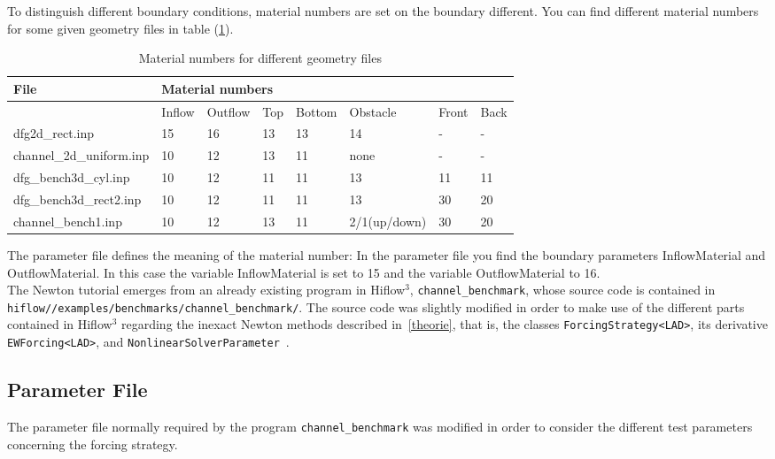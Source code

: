 \documentclass[a4paper, 11pt, twoside]{article}
\begin{document}
To distinguish different boundary conditions, material numbers are set on the boundary different. You can find different material numbers for some given geometry files in table (\ref{materialnumbers}).
\begin{table}[htb]
  \begin{tabular}{|l|l|l|l|l|l|l|l|}
  \hline
  File & \multicolumn{7}{|l|}{Material numbers} \\
  \hline
  & Inflow & Outflow & Top & Bottom & Obstacle & Front & Back \\
  \hline
  dfg2d\_rect.inp & 15 & 16 & 13 & 13 & 14 & - & - \\
  \hline
  channel\_2d\_uniform.inp & 10 & 12 & 13 & 11 & none & - & - \\
  \hline
  dfg\_bench3d\_cyl.inp & 10 & 12 & 11 & 11 & 13 & 11 & 11 \\
  \hline
  dfg\_bench3d\_rect2.inp & 10 & 12 & 11 & 11 & 13 & 30 & 20 \\
  \hline
  channel\_bench1.inp & 10 & 12 & 13 & 11 & 2/1(up/down) & 30 & 20 \\
  \hline
  \end{tabular}
\caption{Material numbers for different geometry files}
\label{materialnumbers}
\end{table}
The parameter file defines the meaning of the material number:
In the parameter file you find the boundary parameters InflowMaterial and OutflowMaterial. 
In this case the variable InflowMaterial is set to 15 and the variable OutflowMaterial to 16.\\

The Newton tutorial emerges from an already existing program in Hiflow$^3$, \verb+channel_benchmark+, whose source code is contained in  \verb+hiflow//examples/benchmarks/channel_benchmark/+. The source code was slightly modified in order to make use of the different parts contained in Hiflow$^3$ regarding the inexact Newton methods described in~\ref{theorie}, that is, the classes \verb+ForcingStrategy<LAD>+, its derivative \verb+EWForcing<LAD>+, and \verb+NonlinearSolverParameter+~\cite{hiflow3:nonlinear}.

\subsection{Parameter File} \label{sectionparameter file}
The parameter file normally required by the program \verb+channel_benchmark+ was modified in order to consider the different test parameters  concerning the forcing strategy.
\end{document}
